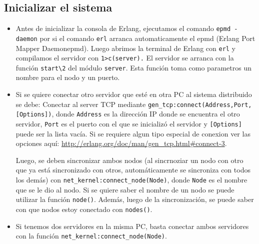 \documentclass[a4paper]{article}
\newcommand{\blacktr}[0]{\item[$\blacktriangleright$]}
\begin{document}
\subsection*{Inicializar el sistema}
\begin{itemize}
    \blacktr Antes de inicializar la consola de Erlang, ejecutamos el comando \texttt{\textdollar epmd -daemon} por si el comando \texttt{\textdollar erl} arranca automaticamente el epmd (Erlang  Port  Mapper  Daemonepmd). Luego abrimos la terminal de Erlang con \texttt{\textdollar erl} y compilamos el servidor con \texttt{1\textgreater c(server).} El servidor se arranca con la función \texttt{start\textbackslash2} del módulo \texttt{server}. Esta función toma como parametros un nombre para el nodo y un puerto. 

    \blacktr Si se quiere conectar otro servidor que esté en otra PC al sistema distribuido se debe:
      Conectar al server TCP mediante \texttt{gen_tcp:connect(Address,Port,[Options])}, donde \texttt{Address} es la dirección IP donde se encuentra el otro servidor, \texttt{Port} es el puerto con el que se inicializó el servidor y \texttt{[Options]} puede ser la lista vacía. Si se requiere algun tipo especial de conexion ver las opciones aquí: \url{http://erlang.org/doc/man/gen_tcp.html#connect-3}.

      Luego, se deben sincronizar ambos nodos (al sincrnoziar un nodo con otro que ya está sincronizado con otros, automáticamente se sincroniza con todos los demás) con \texttt{net_kernel:connect_node(Node)}, donde \texttt{Node} es el nombre que se le dio al nodo. Si se quiere saber el nombre de un nodo se puede utilizar la función \texttt{node()}. Además, luego de la sincronización, se puede saber con que nodos estoy conectado con \texttt{nodes()}.

    \blacktr Si tenemos dos servidores en la misma PC, basta conectar ambos servidores con la función \texttt{net_kernel:connect_node(Node)}.
\end{itemize}
\end{document}
